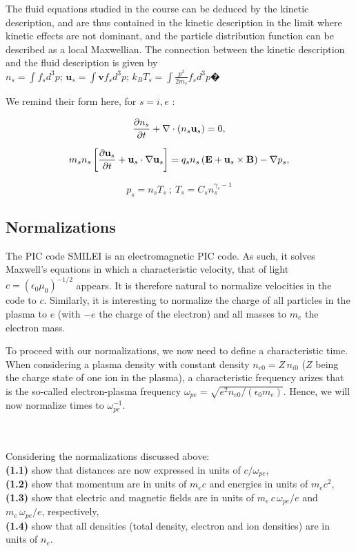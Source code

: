 \documentclass[10pt]{article}
\newcommand{\vE}{\mathbf{E}}
\newcommand{\vB}{\mathbf{B}}
\newcommand{\vv}{\mathbf{v}}
\newcommand{\vu}{\mathbf{u}}
\begin{document}
The fluid equations studied in the course can be deduced by the kinetic description, and are thus contained in the kinetic description 
in the limit where kinetic effects are not dominant, and the particle distribution function can be described as a local Maxwellian. 
The connection between the kinetic description and the fluid description is given by \\$n_s= \int f_s d^3p$; $\vu_s =
\int \vv f_s d^3p$; $k_B T_s =\int \frac{p^2}{2m_s}  f_s d^3p$�

We remind their form here, for  $s=i,e$ :

\begin{equation}
\frac{\partial  n_s}{\partial t}+
 {\bf{\nabla}} \cdot (n_s \vu_s) =  0,
\end{equation}

\begin{equation}
m_s n_s \left[\frac{\partial \vu_s}{\partial t}+\vu_s \cdot {\bf{\nabla}} \vu_s
\right] = q_s n_s \left( \vE + \vu_s \times \vB \right) - {\bf{\nabla}} p_s ,  
\end{equation}


\begin{equation}
p_s = n_s T_s ~;~  
T_s = C_s n_s^{\gamma_s-1}
\end{equation}

\subsection{Normalizations}

The PIC code SMILEI is an electromagnetic PIC code. As such, it solves Maxwell's equations in which a characteristic velocity, that of light $c = (\epsilon_0 \mu_0)^{-1/2}$ appears. It is therefore natural to normalize velocities in the code to $c$. Similarly, it is interesting to normalize the charge of all particles in the plasma to $e$ (with $-e$ the charge of the electron) and all masses to $m_e$ the electron mass.

To proceed with our normalizations, we now need to define a characteristic time. When considering a plasma density with constant density $n_{e0} = Z\,n_{i0}$ ($Z$ being the charge state of one ion in the plasma), a characteristic frequency arizes that is the so-called electron-plasma frequency $\omega_{pe} = \sqrt{e^2 n_{e0}/(\epsilon_0 m_e)}$. Hence, we will now normalize times to $\omega_{pe}^{-1}$.

$ $\\
\\
Considering the normalizations discussed above: \\
{\bf (1.1)} show that distances are now expressed in units of $c/\omega_{pe}$,\\
{\bf (1.2)} show that momentum are in units of $m_e c$ and energies in units of $m_e c^2$,\\
{\bf (1.3)} show that electric and magnetic fields are in units of $m_e\,c\,\omega_{pe}/e$ and $m_e\,\omega_{pe}/e$, respectively,\\
{\bf (1.4)} show that all densities (total density, electron and ion densities) are in units of $n_e$.
\end{document}
